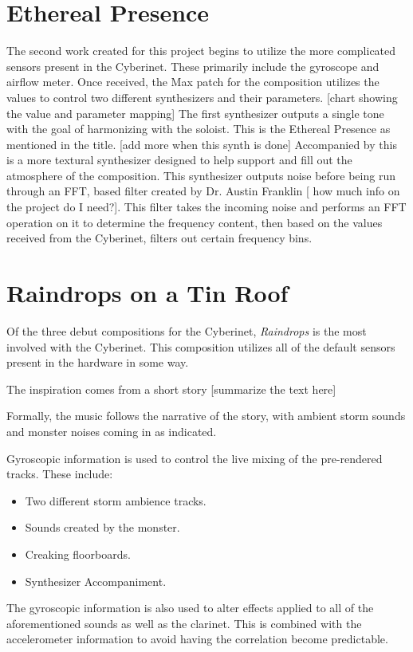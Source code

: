 \section{Ethereal Presence}
The second work created for this project begins to utilize the more complicated sensors present in the Cyberinet. These primarily include the gyroscope and airflow meter. Once received, the Max patch for the composition utilizes the values to control two different synthesizers and their parameters. 
[chart showing the value and parameter mapping]
The first synthesizer outputs a single tone with the goal of harmonizing with the soloist. This is the Ethereal Presence as mentioned in the title. [add more when this synth is done]
Accompanied by this is a more textural synthesizer designed to help support and fill out the atmosphere of the composition. This synthesizer outputs noise before being run through an FFT, based filter created by Dr. Austin Franklin [ how much info on the project do I need?]. This filter takes the incoming noise and performs an FFT operation on it to determine the frequency content, then based on the values received from the Cyberinet, filters out certain frequency bins. 


\section{Raindrops on a Tin Roof}
Of the three debut compositions for the Cyberinet, \textit{Raindrops} is the most involved with the Cyberinet. This composition utilizes all of the default sensors present in the hardware in some way. 

The inspiration comes from a short story [summarize the text here]

Formally, the music follows the narrative of the story, with ambient storm sounds and monster noises coming in as indicated. 

Gyroscopic information is used to control the live mixing of the pre-rendered tracks. These include:
\begin{itemize}
    \item Two different storm ambience tracks.
    \item Sounds created by the monster.
    \item Creaking floorboards.
    \item Synthesizer Accompaniment.
\end{itemize}

The gyroscopic information is also used to alter effects applied to all of the aforementioned sounds as well as the clarinet. This is combined with the accelerometer information to avoid having the correlation become predictable.

